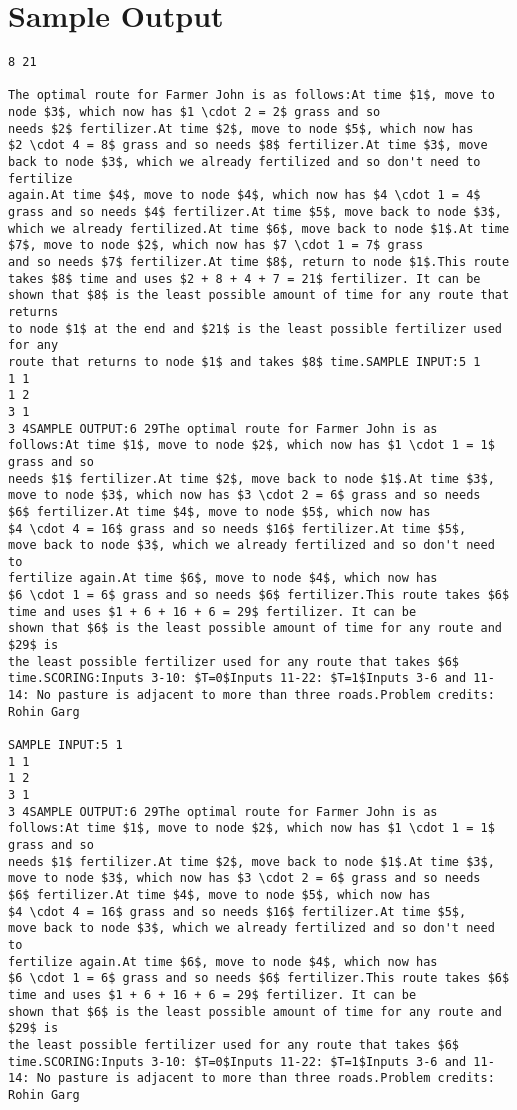 \documentclass[12pt]{article}
\begin{document}
\section*{Sample Output}
\begin{verbatim}
8 21

The optimal route for Farmer John is as follows:At time $1$, move to node $3$, which now has $1 \cdot 2 = 2$ grass and so
needs $2$ fertilizer.At time $2$, move to node $5$, which now has
$2 \cdot 4 = 8$ grass and so needs $8$ fertilizer.At time $3$, move
back to node $3$, which we already fertilized and so don't need to fertilize
again.At time $4$, move to node $4$, which now has $4 \cdot 1 = 4$
grass and so needs $4$ fertilizer.At time $5$, move back to node $3$,
which we already fertilized.At time $6$, move back to node $1$.At time $7$, move to node $2$, which now has $7 \cdot 1 = 7$ grass
and so needs $7$ fertilizer.At time $8$, return to node $1$.This route takes $8$ time and uses $2 + 8 + 4 + 7 = 21$ fertilizer. It can be
shown that $8$ is the least possible amount of time for any route that returns
to node $1$ at the end and $21$ is the least possible fertilizer used for any
route that returns to node $1$ and takes $8$ time.SAMPLE INPUT:5 1
1 1
1 2
3 1
3 4SAMPLE OUTPUT:6 29The optimal route for Farmer John is as follows:At time $1$, move to node $2$, which now has $1 \cdot 1 = 1$ grass and so
needs $1$ fertilizer.At time $2$, move back to node $1$.At time $3$, move to node $3$, which now has $3 \cdot 2 = 6$ grass and so needs
$6$ fertilizer.At time $4$, move to node $5$, which now has
$4 \cdot 4 = 16$ grass and so needs $16$ fertilizer.At time $5$,
move back to node $3$, which we already fertilized and so don't need to
fertilize again.At time $6$, move to node $4$, which now has
$6 \cdot 1 = 6$ grass and so needs $6$ fertilizer.This route takes $6$ time and uses $1 + 6 + 16 + 6 = 29$ fertilizer. It can be
shown that $6$ is the least possible amount of time for any route and $29$ is
the least possible fertilizer used for any route that takes $6$ time.SCORING:Inputs 3-10: $T=0$Inputs 11-22: $T=1$Inputs 3-6 and 11-14: No pasture is adjacent to more than three roads.Problem credits: Rohin Garg

SAMPLE INPUT:5 1
1 1
1 2
3 1
3 4SAMPLE OUTPUT:6 29The optimal route for Farmer John is as follows:At time $1$, move to node $2$, which now has $1 \cdot 1 = 1$ grass and so
needs $1$ fertilizer.At time $2$, move back to node $1$.At time $3$, move to node $3$, which now has $3 \cdot 2 = 6$ grass and so needs
$6$ fertilizer.At time $4$, move to node $5$, which now has
$4 \cdot 4 = 16$ grass and so needs $16$ fertilizer.At time $5$,
move back to node $3$, which we already fertilized and so don't need to
fertilize again.At time $6$, move to node $4$, which now has
$6 \cdot 1 = 6$ grass and so needs $6$ fertilizer.This route takes $6$ time and uses $1 + 6 + 16 + 6 = 29$ fertilizer. It can be
shown that $6$ is the least possible amount of time for any route and $29$ is
the least possible fertilizer used for any route that takes $6$ time.SCORING:Inputs 3-10: $T=0$Inputs 11-22: $T=1$Inputs 3-6 and 11-14: No pasture is adjacent to more than three roads.Problem credits: Rohin Garg


\end{verbatim}
\end{document}
